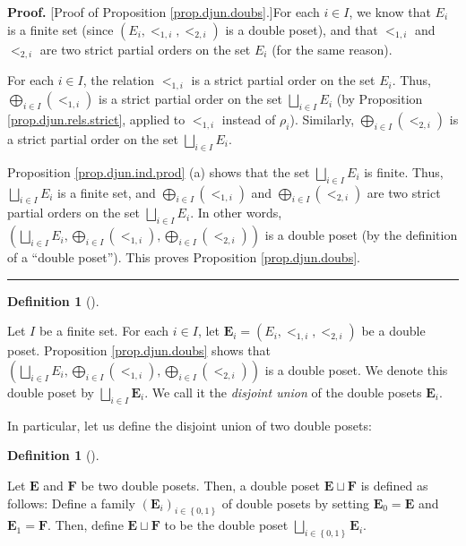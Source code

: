 \documentclass[numbers=enddot,12pt,final,onecolumn,notitlepage,abstracton]{scrartcl}
\theoremstyle{definition}
\newtheorem{defi}[theo]{Definition}
\newenvironment{definition}[1][]
{\begin{defi}[#1]\begin{leftbar}}
{\end{leftbar}\end{defi}}
\newenvironment{proof}[1][Proof]{\noindent\textbf{#1.} }{\ \rule{0.5em}{0.5em}}
\newenvironment{verlong}{}{}
\begin{document}
\begin{verlong}
\begin{footnotesize}
\begin{proof}
[Proof of Proposition \ref{prop.djun.doubs}.]For each $i\in I$, we know that
$E_{i}$ is a finite set (since $\left(  E_{i},<_{1,i},<_{2,i}\right)  $ is a
double poset), and that $<_{1,i}$ and $<_{2,i}$ are two strict partial orders
on the set $E_{i}$ (for the same reason).

For each $i\in I$, the relation $<_{1,i}$ is a strict partial order on the set
$E_{i}$. Thus, $\bigoplus_{i\in I}\left(  <_{1,i}\right)  $ is a strict
partial order on the set $\bigsqcup_{i\in I}E_{i}$ (by Proposition
\ref{prop.djun.rels.strict}, applied to $<_{1,i}$ instead of $\rho_{i}$).
Similarly, $\bigoplus_{i\in I}\left(  <_{2,i}\right)  $ is a strict partial
order on the set $\bigsqcup_{i\in I}E_{i}$.

Proposition \ref{prop.djun.ind.prod} (a) shows that the set $\bigsqcup_{i\in
I}E_{i}$ is finite. Thus, $\bigsqcup_{i\in I}E_{i}$ is a finite set, and
$\bigoplus_{i\in I}\left(  <_{1,i}\right)  $ and $\bigoplus_{i\in I}\left(
<_{2,i}\right)  $ are two strict partial orders on the set $\bigsqcup_{i\in
I}E_{i}$. In other words, \newline
$\left(  \bigsqcup_{i\in I}E_{i},\bigoplus_{i\in
I}\left(  <_{1,i}\right)  ,\bigoplus_{i\in I}\left(  <_{2,i}\right)  \right)
$ is a double poset (by the definition of a \textquotedblleft double
poset\textquotedblright). This proves Proposition \ref{prop.djun.doubs}.
\end{proof}

\begin{definition}
\label{def.djun.doubs}Let $I$ be a finite set. For each $i\in I$, let
$\mathbf{E}_{i}=\left(  E_{i},<_{1,i},<_{2,i}\right)  $ be a double poset.
Proposition \ref{prop.djun.doubs} shows that $\left(  \bigsqcup_{i\in I}%
E_{i},\bigoplus_{i\in I}\left(  <_{1,i}\right)  ,\bigoplus_{i\in I}\left(
<_{2,i}\right)  \right)  $ is a double poset. We denote this double poset by
$\bigsqcup_{i\in I}\mathbf{E}_{i}$. We call it the \textit{disjoint union} of
the double posets $\mathbf{E}_{i}$.
\end{definition}

In particular, let us define the disjoint union of two double posets:

\begin{definition}
\label{def.djun.doubs2}Let $\mathbf{E}$ and $\mathbf{F}$ be two double posets.
Then, a double poset $\mathbf{E}\sqcup\mathbf{F}$ is defined as follows:
Define a family $\left(  \mathbf{E}_{i}\right)  _{i\in\left\{  0,1\right\}  }$
of double posets by setting $\mathbf{E}_{0}=\mathbf{E}$ and $\mathbf{E}%
_{1}=\mathbf{F}$. Then, define $\mathbf{E}\sqcup\mathbf{F}$ to be the double
poset $\bigsqcup_{i\in\left\{  0,1\right\}  }\mathbf{E}_{i}$.
\end{definition}


\end{footnotesize}
\end{verlong}
\end{document}

